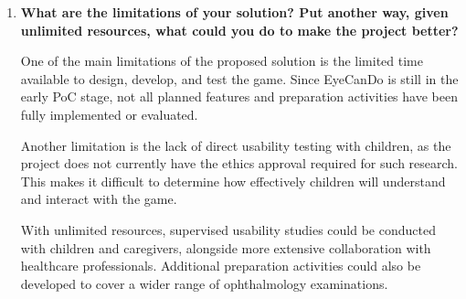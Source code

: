\documentclass[10pt, titlepage]{article}
\begin{document}
\begin{enumerate}
    While developing the Design Document, the SRS and Hazard
    Analysis were also revised based on feedback from the
    supervisor and TAs. These changes helped clarify existing
    requirements and ensure that the proposed design addressed
    the project's functional, safety, and usability expectations.

    In the SRS, several requirements were refined regarding
    gameplay interactions, saving and restoring progress, and
    the accuracy of educational content. Requirement traceability
    was also updated, and project goals were clarified to better
    reflect what could realistically be evaluated during the
    capstone.

    In the Hazard Analysis, several safety requirements were
    improved, including those related to device performance,
    inclusive character customization, audio interruptions,
    and the presentation of medical information. Mitigation
    strategies were also clarified to better align with the
    project's scope.

    Since some requirements and identifiers changed, the
    corresponding references in other documents, including
    the VnV Plan, were updated to maintain consistency
    and traceability.

    Overall, these revisions provided a clearer understanding
    of the system and a stronger foundation for defining
    module responsibilities and interfaces in the MIS and MG.

    \item \textbf{What are the limitations of your solution? Put another way,
    given unlimited resources, what could you do to make the project better?}

    
    One of the main limitations of the proposed solution is the
    limited time available to design, develop, and test the game.
    Since EyeCanDo is still in the early PoC stage, not all
    planned features and preparation activities have been
    fully implemented or evaluated.

    Another limitation is the lack of direct usability testing
    with children, as the project does not currently have the
    ethics approval required for such research. This makes it
    difficult to determine how effectively children will
    understand and interact with the game.

    With unlimited resources, supervised usability studies
    could be conducted with children and caregivers, alongside
    more extensive collaboration with healthcare professionals.
    Additional preparation activities could also be developed
    to cover a wider range of ophthalmology examinations.


\end{enumerate}
\end{document}
